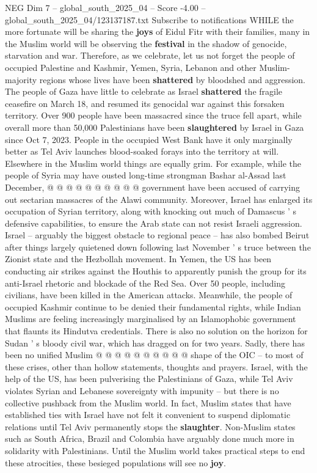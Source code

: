 \begin{textsample}{NEG Dim 7 – global\_south\_2025\_04 – Score -4.00 – global\_south\_2025\_04/123137187.txt}  \label{ex:f7_neg_310}
Subscribe to notifications WHILE the more fortunate will be sharing the \textbf{joys} of Eidul Fitr with their families, many in the Muslim world will be observing the \textbf{festival} in the shadow of genocide, starvation and war.
Therefore, as we celebrate, let us not forget the people of occupied Palestine and Kashmir, Yemen, Syria, Lebanon and other Muslim-majority regions whose lives have been \textbf{shattered} by bloodshed and aggression.
The people of Gaza have little to celebrate as Israel \textbf{shattered} the fragile ceasefire on March 18, and resumed its genocidal war against this forsaken territory.
Over 900 people have been massacred since the truce fell apart, while overall more than 50,000 Palestinians have been \textbf{slaughtered} by Israel in Gaza since Oct 7, 2023.
People in the occupied West Bank have it only marginally better as Tel Aviv launches blood-soaked forays into the territory at will.
Elsewhere in the Muslim world things are equally grim.
For example, while the people of Syria may have ousted long-time strongman Bashar al-Assad last December, @ @ @ @ @ @ @ @ @ @ government have been accused of carrying out sectarian massacres of the Alawi community.
Moreover, Israel has enlarged its occupation of Syrian territory, along with knocking out much of Damascus ' s defensive capabilities, to ensure the Arab state can not resist Israeli aggression.
Israel -- arguably the biggest obstacle to regional peace -- has also bombed Beirut after things largely quietened down following last November ' s truce between the Zionist state and the Hezbollah movement.
In Yemen, the US has been conducting air strikes against the Houthis to apparently punish the group for its anti-Israel rhetoric and blockade of the Red Sea.
Over 50 people, including civilians, have been killed in the American attacks.
Meanwhile, the people of occupied Kashmir continue to be denied their fundamental rights, while Indian Muslims are feeling increasingly marginalised by an Islamophobic government that flaunts its Hindutva credentials.
There is also no solution on the horizon for Sudan ' s bloody civil war, which has dragged on for two years.
Sadly, there has been no unified Muslim @ @ @ @ @ @ @ @ @ @ shape of the OIC -- to most of these crises, other than hollow statements, thoughts and prayers.
Israel, with the help of the US, has been pulverising the Palestinians of Gaza, while Tel Aviv violates Syrian and Lebanese sovereignty with impunity -- but there is no collective pushback from the Muslim world.
In fact, Muslim states that have established ties with Israel have not felt it convenient to suspend diplomatic relations until Tel Aviv permanently stops the \textbf{slaughter}.
Non-Muslim states such as South Africa, Brazil and Colombia have arguably done much more in solidarity with Palestinians.
Until the Muslim world takes practical steps to end these atrocities, these besieged populations will see no \textbf{joy}.

\end{textsample}
